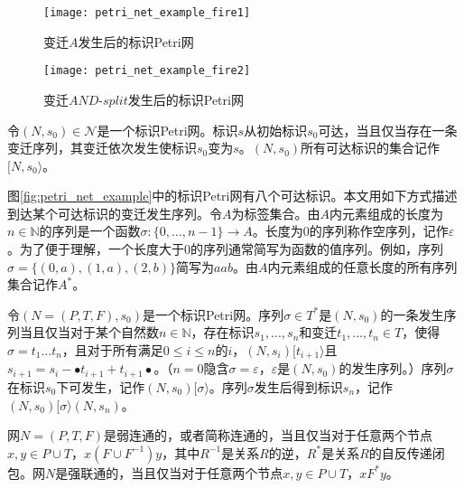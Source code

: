 \begin{figure}[htbp]
  \centering
  \texttt{[image: petri\_net\_example\_fire1]}
  \caption{变迁$A$发生后的标识Petri网\label{fig:petri_net_example_fire1}}
\end{figure}

\begin{figure}[htbp]
  \centering
  \texttt{[image: petri\_net\_example\_fire2]}
  \caption{变迁$AND$-$split$发生后的标识Petri网\label{fig:petri_net_example_fire2}}
\end{figure}

\begin{definition}[可达标识]\label{def:reachable_markings}
令$(N,s_{0})\in\mathcal{N}$是一个标识Petri网。标识$s$从初始标识$s_{0}$可达，当且仅当存在一条变迁序列，其变迁依次发生使标识$s_{0}$变为$s$。$(N,s_{0})$所有可达标识的集合记作$[N,s_{0}\rangle$。
\end{definition}

图\ref{fig:petri_net_example}中的标识Petri网有八个可达标识。本文用如下方式描述到达某个可达标识的变迁发生序列。令$A$为标签集合。由$A$内元素组成的长度为$n\in\mathbb{N}$的序列是一个函数$\sigma:\{0,...,n-1\}\rightarrow A$。长度为0的序列称作空序列，记作$\varepsilon$。为了便于理解，一个长度大于0的序列通常简写为函数的值序列。例如，序列$\sigma=\{(0,a),(1,a),(2,b)\}$简写为$aab$。由$A$内元素组成的任意长度的所有序列集合记作$A^{*}$。

\begin{definition}[发生序列]\label{def:firing_sequence}
令$(N=(P,T,F),s_{0})$是一个标识Petri网。序列$\sigma\in T^{*}$是$(N,s_{0})$的一条发生序列当且仅当对于某个自然数$n\in\mathbb{N}$，存在标识$s_{1},...,s_{n}$和变迁$t_{1},...,t_{n}\in T$，使得$\sigma=t_{1}...t_{n}$，且对于所有满足$0\leq i\leq n$的$i$，$(N,s_{i})[t_{i+1}\rangle$且$s_{i+1}=s_{i}-\bullet t_{i+1}+t_{i+1}\bullet$。（$n=0$隐含$\sigma=\varepsilon$，$\varepsilon$是$(N,s_{0})$的发生序列。）序列$\sigma$在标识$s_{0}$下可发生，记作$(N,s_{0})[\sigma\rangle$。序列$\sigma$发生后得到标识$s_{n}$，记作$(N,s_{0})[\sigma\rangle(N,s_{n})$。
\end{definition}

\begin{definition}[连通性]\label{def:connectedness}
网$N=(P,T,F)$是弱连通的，或者简称连通的，当且仅当对于任意两个节点$x,y\in P\cup T$，$x(F\cup F^{-1})y$，其中$R^{-1}$是关系$R$的逆，$R^{*}$是关系$R$的自反传递闭包。网$N$是强联通的，当且仅当对于任意两个节点$x,y\in P\cup T$，$xF^{*}y$。
\end{definition}

